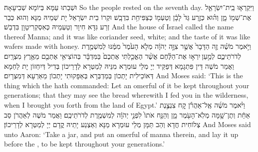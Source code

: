 {וּשְׁבַתוּ עַמָּא בְּיוֹמָא שְׁבִיעָאָה׃}
{So the people rested on the seventh day.}{}
{וַיִּקְרְא֧וּ בֵֽית־יִשְׂרָאֵ֛ל אֶת־שְׁמ֖וֹ מָ֑ן וְה֗וּא כְּזֶ֤רַע גַּד֙ לָבָ֔ן וְטַעְמ֖וֹ כְּצַפִּיחִ֥ת בִּדְבָֽשׁ׃
}
{וּקְרוֹ בֵית יִשְׂרָאֵל יָת שְׁמֵיהּ מַנָּא וְהוּא כְּבַר זְרַע גִּדָּא חִיוָר וְטַעְמֵיהּ כְּאִסְקְרִיטָוָן בִּדְבַשׁ׃}
{And the house of Israel called the name thereof Manna; and it was like coriander seed, white; and the taste of it was like wafers made with honey.}{}
{וַיֹּ֣אמֶר מֹשֶׁ֗ה זֶ֤ה הַדָּבָר֙ אֲשֶׁ֣ר צִוָּ֣ה יְהֹוָ֔ה מְלֹ֤א הָעֹ֙מֶר֙ מִמֶּ֔נּוּ לְמִשְׁמֶ֖רֶת לְדֹרֹתֵיכֶ֑ם לְמַ֣עַן \legarmeh  יִרְא֣וּ אֶת־הַלֶּ֗חֶם אֲשֶׁ֨ר הֶאֱכַ֤לְתִּי אֶתְכֶם֙ בַּמִּדְבָּ֔ר בְּהוֹצִיאִ֥י אֶתְכֶ֖ם מֵאֶ֥רֶץ מִצְרָֽיִם׃
}
{וַאֲמַר מֹשֶׁה דֵּין פִּתְגָמָא דְּפַקֵּיד יְיָ מְלֵי עוּמְרָא מִנֵּיהּ לְמַטְּרָא לְדָרֵיכוֹן בְּדִיל דְּיִחְזוֹן יָת לַחְמָא דְּאוֹכֵילִית יָתְכוֹן בְּמַדְבְּרָא בְּאַפָּקוּתִי יָתְכוֹן מֵאַרְעָא דְּמִצְרָיִם׃}
{And Moses said: ‘This is the thing which the \lord\space hath commanded: Let an omerful of it be kept throughout your generations; that they may see the bread wherewith I fed you in the wilderness, when I brought you forth from the land of Egypt.’}{}
{וַיֹּ֨אמֶר מֹשֶׁ֜ה אֶֽל־אַהֲרֹ֗ן קַ֚ח צִנְצֶ֣נֶת אַחַ֔ת וְתֶן־שָׁ֥מָּה מְלֹֽא־הָעֹ֖מֶר מָ֑ן וְהַנַּ֤ח אֹתוֹ֙ לִפְנֵ֣י יְהֹוָ֔ה לְמִשְׁמֶ֖רֶת לְדֹרֹתֵיכֶֽם׃
}
{וַאֲמַר מֹשֶׁה לְאַהֲרֹן סַב צְלוֹחִית חֲדָא וְהַב תַּמָּן מְלֵי עוּמְרָא מַנָּא וְאַצְנַע יָתֵיהּ קֳדָם יְיָ לְמַטְּרָא לְדָרֵיכוֹן׃}
{And Moses said unto Aaron: ‘Take a jar, and put an omerful of manna therein, and lay it up before the \lord, to be kept throughout your generations.’}{}
